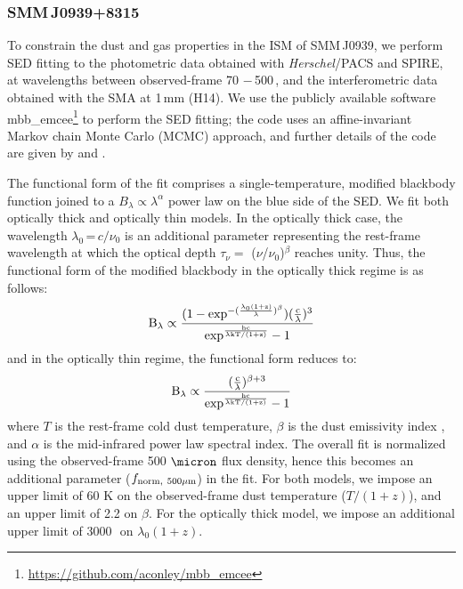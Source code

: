 \documentclass[iop, revtex4]{emulateapj}
\begin{document}
\subsubsection{SMM\,J0939+8315} \label{sec:SEDBg}
To constrain the dust and gas properties in the ISM of SMM\,J0939, we perform SED fitting to the
photometric data obtained with {\it Herschel}/PACS and SPIRE, at wavelengths
between observed-frame 70\,\micron\,$-$\,500\,\micron, and the interferometric data obtained with the SMA at 1\,mm (H14). We use the publicly
available software {\sc mbb\_emcee}\footnote{\url{https://github.com/aconley/mbb\_emcee}} to perform the SED fitting; the code uses an affine-invariant Markov chain Monte
Carlo (MCMC) approach, and further details of the code are given by \citet{Riechers13a} and \citet{Dowell14a}. \par
The
functional form of the fit comprises a single-temperature, modified blackbody function joined to a $B_{\lambda} \propto \lambda^\alpha
$ power law on the blue
side of the SED.
We fit both optically thick and optically thin models. In the optically thick case, the wavelength $
\lambda_0$\,=\,${c}/{\nu_0}$ is an additional parameter representing the rest-frame wavelength at which the optical
depth $\tau_{\nu} =$ ($\nu$/$\nu_0$)$^\beta$ reaches unity. Thus, the functional form of the modified blackbody
in the optically thick regime is as follows:
\begin{equation}
\rm B_{\lambda} \propto \frac{(1-exp^{-(\frac{\lambda_0 (1+z)}{\lambda})^{\beta}})(\frac{c}{\lambda})^3}
{exp^{\frac{hc}{\lambda\rm{kT/(1+z)} } }-1}
\end{equation}
and in the optically thin regime, the functional form reduces to:
\begin{equation}
\rm B_{\lambda} \propto \frac{(\frac{c}{\lambda})^{\beta+3}}{exp^{\frac{hc}{\lambda\rm{kT/(1+z)}}}-1}
\end{equation}
where $T$ is the rest-frame cold dust temperature, $\beta$ is the dust emissivity index 
, and $\alpha$ is the mid-infrared power law spectral index. The overall fit is normalized using the observed-frame 500
$\micron$ flux density, hence this becomes an additional parameter ($f_{\rm norm,\ 500\mu m}$) in the fit. For both models, we impose an upper limit of 60 K on the observed-frame dust temperature ($T/(1+z)$), and an upper limit of 2.2 on
$\beta$. For the optically thick model, we impose an additional upper limit of 3000\,\micron\ on $\lambda_0 (1+z)$.
\end{document}
